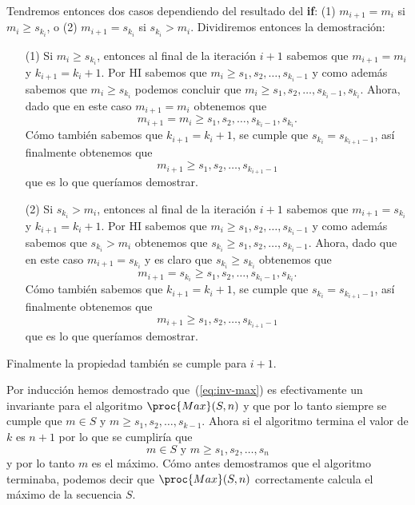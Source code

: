 \begin{ejemplo}
\begin{inducciondemo}
  Tendremos entonces dos casos dependiendo del resultado del {\bf if}: (1) $m_{i+1}=m_i$ si $m_i\geq s_{k_i}$, o (2) $m_{i+1}=s_{k_i}$ si $s_{k_i}>m_{i}$.
  Dividiremos entonces la demostración:
  \begin{itemize}
    \item[(1)] Si $m_i\geq s_{k_i}$, entonces al final de la iteración $i+1$ sabemos que $m_{i+1}=m_i$ y $k_{i+1}=k_i+1$.
    Por HI sabemos que $m_i\geq s_1,s_2,\ldots,s_{k_i-1}$ y como además sabemos que $m_i\geq s_{k_i}$ podemos concluir que $m_i\geq s_1,s_2,\ldots,s_{k_i-1},s_{k_i}$.
    Ahora, dado que en este caso $m_{i+1}=m_i$ obtenemos que
    \[
    m_{i+1}=m_i\geq s_1,s_2,\ldots,s_{k_i-1},s_{k_i}.
    \] 
    Cómo también sabemos que $k_{i+1}=k_i+1$, se cumple que $s_{k_i}=s_{k_{i+1}-1}$, así finalmente obtenemos que
    \[
    m_{i+1}\geq s_1,s_2,\ldots,s_{k_{i+1}-1}
    \] 
    que es lo que queríamos demostrar.
    \item[(2)] Si $s_{k_i}>m_i$, entonces al final de la iteración $i+1$ sabemos que $m_{i+1}=s_{k_i}$ y $k_{i+1}=k_i+1$.
    Por HI sabemos que $m_i\geq s_1,s_2,\ldots,s_{k_i-1}$ y como además sabemos que $s_{k_i}>m_i$  
    obtenemos que $s_{k_i}\geq s_1,s_2,\ldots,s_{k_i-1}$.
    Ahora, dado que en este caso $m_{i+1}=s_{k_i}$ y es claro que $s_{k_i}\geq s_{k_i}$ obtenemos que
    \[
    m_{i+1}=s_{k_i}\geq s_1,s_2,\ldots,s_{k_i-1},s_{k_i}.
    \]
    Cómo también sabemos que $k_{i+1}=k_i+1$, se cumple que $s_{k_i}=s_{k_{i+1}-1}$, así finalmente obtenemos que
    \[
    m_{i+1}\geq s_1,s_2,\ldots,s_{k_{i+1}-1}
    \] 
    que es lo que queríamos demostrar.
  \end{itemize}
  Finalmente la propiedad también se cumple para $i+1$.
\end{inducciondemo}
Por inducción hemos demostrado que~(\ref{eq:inv-max}) es efectivamente un invariante para el algoritmo $\proc{Max}(S,n)$ y que por lo tanto siempre se cumple que $m\in S$ y $m\geq s_1,s_2,\ldots,s_{k-1}$.
Ahora si el algoritmo termina el valor de $k$ es $n+1$ por lo que se cumpliría que 
\[
m\in S\text{ y }m\geq s_1,s_2,\ldots, s_n
\]
y por lo tanto $m$ es el máximo.
Cómo antes demostramos que el algoritmo terminaba, podemos decir que $\proc{Max}(S,n)$ correctamente calcula el máximo de la secuencia $S$.
\end{ejemplo}

